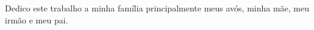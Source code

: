 \begin{dedicatoria}
   \vspace*{\fill}
   	\begin{flushright}
   \noindent
    Dedico este trabalho a minha família principalmente meus avós, minha mãe, meu irmão e meu pai.
   	\end{flushright}
\end{dedicatoria}

